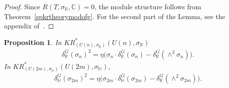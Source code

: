 \documentclass[11pt]{article}
\numberwithin{equation}{section}
\newtheorem{Proposition}[Theorem]{Proposition}
{\theoremstyle{definition}
\newtheorem{Definition}[Theorem]{Definition}
\newtheorem{Example}[Theorem]{Example}
\newtheorem{Remark}[Theorem]{Remark}
}
\begin{document}
\begin{proof}
Since $R(T,
\sigma_\mathbb{R}, \mathbb{C})=0$, the module structure follows from Theorem~\ref{spkrtheorymodofg}.
For the second part of the Lemma, see the appendix of~\cite{Se}.
\end{proof}
\begin{Proposition}
\label{equivkrthysquaresigma}
In $KR^*_{(U(n),
\sigma_\mathbb{R})}(U(n),
\sigma_\mathbb{R})$
\begin{gather}
\label{realsigmasquare}
\delta_\mathbb{R}^G(\sigma_n)^2
=\eta\big(\sigma_n\cdot\delta_\mathbb{R}^G(\sigma_n)-\delta_\mathbb{R}^G(\wedge^2\sigma_n)\big).
\end{gather}
In $KR^*_{(U(2m),
\sigma_\mathbb{H})}(U(2m),
\sigma_\mathbb{H})$,
\begin{gather}
\label{quatsigmasquare}
\delta_\mathbb{H}^G(\sigma_{2m})^2=\eta\big(\sigma_{2m}
\cdot\delta_\mathbb{H}^G(\sigma_{2m})-\delta_\mathbb{R}^G(\wedge^2\sigma_{2m})\big).
\end{gather}
\end{Proposition}
\end{document}
